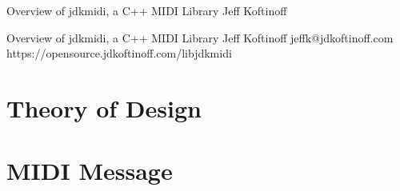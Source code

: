 

\setpdfinfo
{Overview of jdkmidi, a C++ MIDI Library}
{Jeff Koftinoff}



\jdkstitle
{Overview of jdkmidi, a C++ MIDI Library}
{Jeff Koftinoff}
{jeffk@jdkoftinoff.com}
{https://opensource.jdkoftinoff.com/libjdkmidi}

\section{Theory of Design}

\section{MIDI Message}

\printindex

